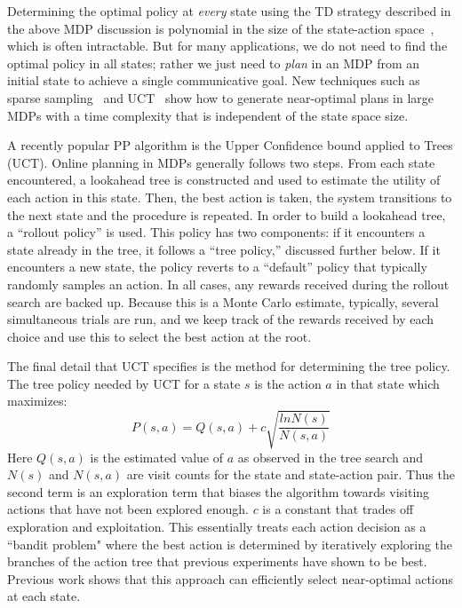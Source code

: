 Determining the optimal policy at {\em every} state using the TD
strategy described in the above MDP discussion is polynomial in the size of the state-action
space~\cite{brafman_2003_rmax}, which is often intractable.
But for many applications, we do not
need to find the optimal policy in all states; rather we just need to {\em plan} in
an MDP from an initial state to achieve a single communicative goal. New techniques such
as sparse sampling~\cite{kearns_1999_sparse} and
UCT~\cite{kocsis_bandit_2006} show how to generate near-optimal plans
in large MDPs with a time complexity that is independent of the state
space size.

A recently popular PP algorithm is the Upper Confidence bound applied to Trees (UCT)\cite{kocsis_bandit_2006}.
Online planning in MDPs generally follows two steps. From each state
encountered, a lookahead tree is constructed and used to estimate the
utility of each action in this state. Then, the best action is taken,
the system transitions to the next state and the procedure is
repeated. In order to build a lookahead tree, a ``rollout policy'' is
used. This policy has two components: if it encounters a state already
in the tree, it follows a ``tree policy,'' discussed further below. If
it encounters a new state, the policy reverts to a ``default'' policy
that typically randomly samples an action. In all cases, any rewards
received during the rollout search are backed up. Because this is a
Monte Carlo estimate, typically, several simultaneous trials are run,
and we keep track of the rewards received by each choice and
use this to select the best action at the root.

The final detail that UCT specifies is the method for determining the tree policy.
The tree policy needed by UCT for a state $s$ is the action $a$ in that state which maximizes:
\begin{equation}
P(s,a) = Q(s,a) + c\sqrt{\frac{ln N(s)}{N(s,a)}}\label{eqn:uct}
\end{equation}
Here $Q(s,a)$ is the estimated value of $a$ as observed in the tree
search and $N(s)$ and $N(s,a)$ are visit counts for the state and
state-action pair. Thus the second term is an exploration term that
biases the algorithm towards visiting actions that have not been
explored enough. $c$ is a constant that trades off exploration and
exploitation. This essentially treats each action decision
as a ``bandit problem" where the best action is determined by iteratively
exploring the branches of the action tree that previous experiments
have shown to be best.  Previous work \cite{uct-go} shows that this approach can
efficiently select near-optimal actions at each state.


